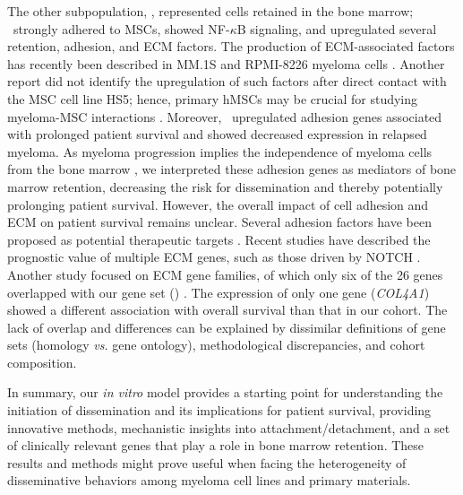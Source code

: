 The other subpopulation, \MAina, represented cells retained in the bone marrow; \linebreak
\MAina\ strongly adhered to MSCs, showed NF-$\kappa$B signaling, and upregulated
several retention, adhesion, and ECM factors. The production of ECM-associated
factors has recently been described in MM.1S and RPMI-8226 myeloma cells
\cite{maichlIdentificationNOTCHdrivenMatrisomeassociated2023}. Another report did not
identify the upregulation of such factors after direct contact with the MSC cell
line HS5; hence, primary hMSCs may be crucial for studying myeloma-MSC
interactions \cite{dziadowiczBoneMarrowStromaInduced2022}. Moreover, \MAina\ upregulated
adhesion genes associated with prolonged patient survival and showed decreased
expression in relapsed myeloma. As myeloma progression implies the independence
of myeloma cells from the bone marrow \cite{bladeExtramedullaryDiseaseMultiple2022,sarinEvaluatingEfficacyMultiple2020}, we interpreted these adhesion genes as
mediators of bone marrow retention, decreasing the risk for dissemination and
thereby potentially prolonging patient survival. However, the overall impact of
cell adhesion and ECM on patient survival remains unclear. Several adhesion
factors have been proposed as potential therapeutic targets
\cite{brandlJunctionalAdhesionMolecule2022, bouzerdanAdhesionMoleculesMultiplea}. Recent studies
have described the prognostic value of multiple ECM genes, such as those driven
by NOTCH \cite{maichlIdentificationNOTCHdrivenMatrisomeassociated2023}. Another study focused
on ECM gene families, of which only six of the 26 genes overlapped with our gene
set () \cite{eversPrognosticValueExtracellular2023}. The
expression of only one gene (\textit{COL4A1}) showed a different association with overall
survival than that in our cohort. The lack of overlap and differences can be
explained by dissimilar definitions of gene sets (homology \textit{vs.} gene ontology),
methodological discrepancies, and cohort composition.

In summary, our \textit{in vitro} model provides a starting point for
understanding the initiation of dissemination and its implications for patient
survival, providing innovative methods, mechanistic insights into
attachment/detachment, and a set of clinically relevant genes that play a role
in bone marrow retention. These results and methods might prove useful when
facing the heterogeneity of disseminative behaviors among myeloma cell lines and
primary materials.



